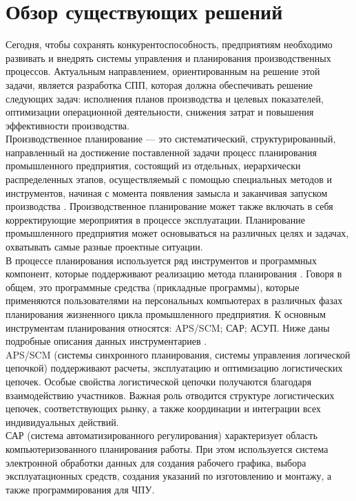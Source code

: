\section{Обзор существующих решений}
\indent Сегодня, чтобы сохранять конкурентоспособность, предприятиям необходимо развивать и внедрять системы управления и планирования производственных процессов. 
Актуальным направлением, ориентированным на решение этой задачи, является разработка СПП, которая должна обеспечивать решение следующих задач: исполнения планов производства и целевых показателей, оптимизации операционной деятельности, снижения затрат и повышения эффективности производства.\\
\indent Производственное планирование — это систематический, структурированный, направленный на достижение поставленной задачи процесс планирования промышленного предприятия, состоящий из отдельных, иерархически распределенных этапов, осуществляемый с помощью специальных методов и инструментов, начиная с момента появления замысла и заканчивая запуском производства \cite{mulBook}.
Производственное планирование может также включать в себя корректирующие мероприятия в процессе эксплуатации. Планирование промышленного предприятия может основываться на различных целях и задачах, охватывать самые разные проектные ситуации.\\
\indent В процессе планирования используется ряд инструментов и программных компонент, которые поддерживают реализацию метода планирования \cite{lodonBook}.
Говоря в общем, это программные средства (прикладные программы), которые применяются пользователями на персональных компьютерах в различных фазах планирования жизненного цикла промышленного предприятия.
К основным инструментам планирования относятся: APS/SCM; САР; АСУП. 
Ниже даны подробные описания данных инструментариев \cite{oliriBook}.\\
\indent APS/SCM (системы синхронного планирования, системы управления логической цепочкой) поддерживают расчеты, эксплуатацию и оптимизацию логистических цепочек. 
Особые свойства логистической цепочки получаются благодаря взаимодействию участников. 
Важная роль отводится структуре логистических цепочек, соответствующих рынку, а также координации и интеграции всех индивидуальных действий.\\
\indent САР (система автоматизированного регулирования) характеризует область компьютеризованного планирования работы. 
При этом используется система электронной обработки данных для создания рабочего графика, выбора эксплуатационных средств, создания указаний по изготовлению и монтажу, а также программирования для ЧПУ.\\
